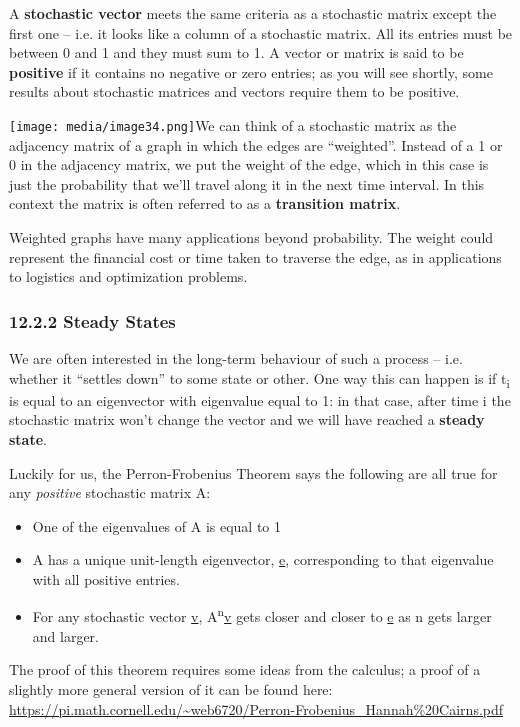 \documentclass[oneside,english]{amsbook}
\numberwithin{section}{chapter}
\theoremstyle{plain}
\theoremstyle{definition}
\begin{document}
A \textbf{stochastic vector} meets the same criteria as a stochastic
matrix except the first one -- i.e. it looks like a column of a
stochastic matrix. All its entries must be between 0 and 1 and they must
sum to 1. A vector or matrix is said to be \textbf{positive} if it
contains no negative or zero entries; as you will see shortly, some
results about stochastic matrices and vectors require them to be
positive.

\texttt{[image: media/image34.png]}We
can think of a stochastic matrix as the adjacency matrix of a graph in
which the edges are ``weighted''. Instead of a 1 or 0 in the adjacency
matrix, we put the weight of the edge, which in this case is just the
probability that we'll travel along it in the next time interval. In
this context the matrix is often referred to as a \textbf{transition
	matrix}.

Weighted graphs have many applications beyond probability. The weight
could represent the financial cost or time taken to traverse the edge,
as in applications to logistics and optimization problems.

\subsubsection{12.2.2 Steady States}\label{steady-states}

We are often interested in the long-term behaviour of such a process --
i.e. whether it ``settles down'' to some state or other. One way this
can happen is if t\textsubscript{i} is equal to an eigenvector with
eigenvalue equal to 1: in that case, after time i the stochastic matrix
won't change the vector and we will have reached a \textbf{steady
	state}.

Luckily for us, the Perron-Frobenius Theorem says the following are all
true for any \emph{positive} stochastic matrix A:

\begin{itemize}
	\item
	One of the eigenvalues of A is equal to 1
	\item
	A has a unique unit-length eigenvector, \ul{e}, corresponding to that
	eigenvalue with all positive entries.
	\item
	For any stochastic vector \ul{v}, A\textsuperscript{n}\ul{v} gets
	closer and closer to \ul{e} as n gets larger and larger.
\end{itemize}

The proof of this theorem requires some ideas from the calculus; a proof
of a slightly more general version of it can be found here:
\url{https://pi.math.cornell.edu/~web6720/Perron-Frobenius_Hannah\%20Cairns.pdf}
\end{document}
